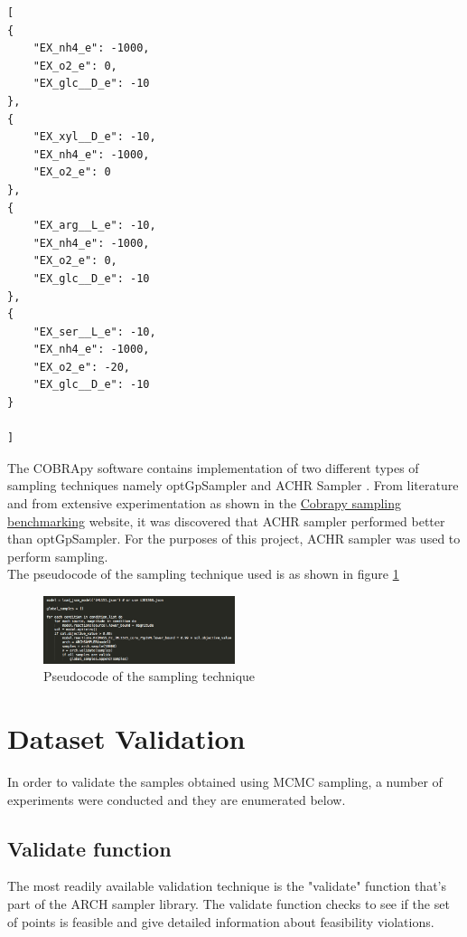 \documentclass[12pt,chapterheads]{ucsd}
\begin{document}
\begin{spacing}{1}
\begin{lstlisting}[caption={Sampling conditions}, label={lst:sample_conds}]
[
{
    "EX_nh4_e": -1000,
    "EX_o2_e": 0,
    "EX_glc__D_e": -10
},
{
    "EX_xyl__D_e": -10,
    "EX_nh4_e": -1000,
    "EX_o2_e": 0
},
{
    "EX_arg__L_e": -10,
    "EX_nh4_e": -1000,
    "EX_o2_e": 0,
    "EX_glc__D_e": -10
},
{
    "EX_ser__L_e": -10,
    "EX_nh4_e": -1000,
    "EX_o2_e": -20,
    "EX_glc__D_e": -10
}

]
\end{lstlisting}
\end{spacing}

The COBRApy software contains implementation of two different types of sampling techniques namely optGpSampler \cite{10.1371/journal.pone.0086587} and ACHR Sampler \cite{Thiele25032005}. From literature and from extensive experimentation as shown in the  \href{https://github.com/cdiener/cobra-docker/blob/master/sampling_benchmark.ipynb}{Cobrapy sampling benchmarking} website, it was discovered that ACHR sampler performed better than optGpSampler. For the purposes of this project, ACHR sampler was used to perform sampling.\\
The pseudocode of the sampling technique used is as shown in figure  \ref{fig:sampling_pseudo}

\begin{figure}[h] 
\centering
\includegraphics[width=0.5\textwidth]{Figures/sampling_pseudo}
\caption[Sampling pseudocode]
{Pseudocode of the sampling technique}
\label{fig:sampling_pseudo}
\end{figure}


\section{Dataset Validation}
In order to validate the samples obtained using MCMC sampling, a number of experiments were conducted and they are enumerated below.
\subsection{Validate function}
The most readily available validation technique is the "validate" function that's part of the ARCH sampler library. The validate function checks to see if the set of points is feasible and give detailed information about feasibility violations. 
\end{document}
